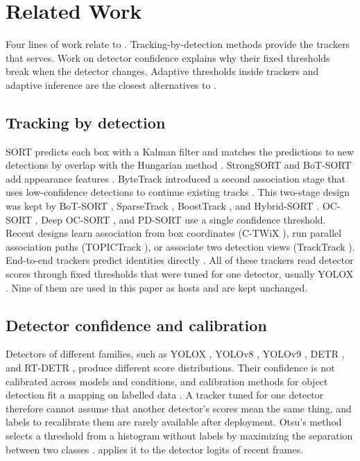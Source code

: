 \section{Related Work}\label{sec:related}

Four lines of work relate to \scl{}. Tracking-by-detection methods provide the
trackers that \scl{} serves. Work on detector confidence explains why their
fixed thresholds break when the detector changes. Adaptive thresholds inside
trackers and adaptive inference are the closest alternatives to \scl{}.

\subsection{Tracking by detection}
SORT predicts each box with a Kalman filter and matches the predictions to new
detections by overlap with the Hungarian method \cite{bewley2016sort}.
StrongSORT and BoT-SORT add appearance features
\cite{du2023strongsort,aharon2022botsort}. ByteTrack
introduced a second association stage that uses low-confidence detections to
continue existing tracks \cite{zhang2022bytetrack}. This two-stage design was
kept by BoT-SORT \cite{aharon2022botsort}, SparseTrack \cite{liu2025sparsetrack},
BoostTrack \cite{stanojevic2024boosttrack}, and Hybrid-SORT
\cite{yang2024hybridsort}. OC-SORT \cite{cao2023ocsort}, Deep OC-SORT
\cite{maggiolino2023deepocsort}, and PD-SORT \cite{wang2025pdsort} use a single
confidence threshold. Recent designs learn association from box coordinates
(C-TWiX \cite{miah2025twix}), run parallel association paths (TOPICTrack
\cite{cao2025topictrack}), or associate two detection views (TrackTrack
\cite{shim2025tracktrack}). End-to-end trackers predict identities directly
\cite{zeng2022motr,gao2025motip}. All of these trackers read detector scores
through fixed thresholds that were tuned for one detector, usually YOLOX
\cite{ge2021yolox}. Nine of them are used in this paper as hosts and are kept
unchanged.

\subsection{Detector confidence and calibration}
Detectors of different families, such as YOLOX \cite{ge2021yolox}, YOLOv8
\cite{jocher2023yolov8}, YOLOv9 \cite{wang2024yolov9}, DETR
\cite{carion2020detr}, and RT-DETR
\cite{zhao2024rtdetr}, produce different score distributions. Their confidence
is not calibrated across models and conditions, and calibration methods for
object detection fit a mapping on labelled data \cite{kuppers2020detcalib}.
A tracker tuned for one detector therefore cannot assume that another
detector's scores mean the same thing, and labels to recalibrate them are
rarely available after deployment. Otsu's method selects a threshold from a histogram without labels by
maximizing the separation between two classes \cite{otsu1979}. \scl{}
applies it to the detector logits of recent frames.

